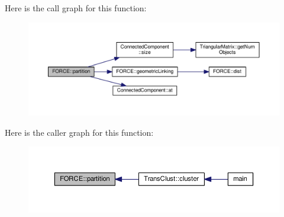 Here is the call graph for this function\-:\nopagebreak
\begin{figure}[H]
\begin{center}
\leavevmode
\includegraphics[width=350pt]{namespaceFORCE_a0c6a6dbc5e4c7cc9d9c33dd884034941_cgraph}
\end{center}
\end{figure}




Here is the caller graph for this function\-:\nopagebreak
\begin{figure}[H]
\begin{center}
\leavevmode
\includegraphics[width=350pt]{namespaceFORCE_a0c6a6dbc5e4c7cc9d9c33dd884034941_icgraph}
\end{center}
\end{figure}


